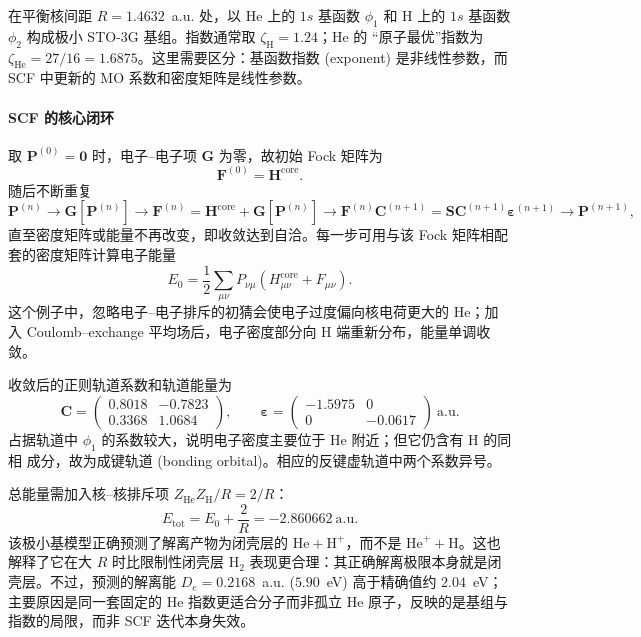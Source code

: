 \documentclass[fontset=none,12pt,a4paper]{ctexart}
\numberwithin{equation}{section}
\begin{document}
在平衡核间距 $R=1.4632$~a.u. 处，以 He 上的 $1s$ 基函数 $\phi_1$ 和 H 上的 $1s$
基函数 $\phi_2$ 构成极小 STO-3G 基组。指数通常取 $\zeta_{\mathrm H}=1.24$；He 的
``原子最优''指数为 $\zeta_{\mathrm{He}}=27/16=1.6875$。这里需要区分：基函数指数
(exponent) 是非线性参数，而 SCF 中更新的 MO 系数和密度矩阵是线性参数。

\paragraph{SCF 的核心闭环}
取 $\mathbf{P}^{(0)}=\mathbf{0}$ 时，电子--电子项 $\mathbf{G}$ 为零，故初始 Fock 矩阵为
\begin{equation}
  \mathbf{F}^{(0)}=\mathbf{H}^{\mathrm{core}}.
\end{equation}
随后不断重复
\begin{equation}
  \mathbf{P}^{(n)}
  \longrightarrow \mathbf{G}[\mathbf{P}^{(n)}]
  \longrightarrow \mathbf{F}^{(n)}=\mathbf{H}^{\mathrm{core}}+\mathbf{G}[\mathbf{P}^{(n)}]
  \longrightarrow \mathbf{F}^{(n)}\mathbf{C}^{(n+1)}
  =\mathbf{S}\mathbf{C}^{(n+1)}\boldsymbol{\varepsilon}^{(n+1)}
  \longrightarrow \mathbf{P}^{(n+1)},
\end{equation}
直至密度矩阵或能量不再改变，即收敛达到自洽。每一步可用与该 Fock
矩阵相配套的密度矩阵计算电子能量
\begin{equation}
  E_0=\frac{1}{2}\sum_{\mu\nu}P_{\nu\mu}
  \left(H^{\mathrm{core}}_{\mu\nu}+F_{\mu\nu}\right).
\end{equation}
这个例子中，忽略电子--电子排斥的初猜会使电子过度偏向核电荷更大的 He；加入
Coulomb--exchange 平均场后，电子密度部分向 H 端重新分布，能量单调收敛。

收敛后的正则轨道系数和轨道能量为
\begin{equation}
  \mathbf{C}=
  \begin{pmatrix}
    0.8018 & -0.7823 \\
    0.3368 &  1.0684
  \end{pmatrix},\qquad
  \boldsymbol{\varepsilon}=
  \begin{pmatrix}
    -1.5975 & 0 \\
    0 & -0.0617
  \end{pmatrix}\ \text{a.u.}
\end{equation}
占据轨道中 $\phi_1$ 的系数较大，说明电子密度主要位于 He 附近；但它仍含有 H 的同相
成分，故为成键轨道 (bonding orbital)。相应的反键虚轨道中两个系数异号。

总能量需加入核--核排斥项 $Z_{\mathrm{He}}Z_{\mathrm H}/R=2/R$：
\begin{equation}
  E_{\mathrm{tot}}=E_0+\frac{2}{R}=-2.860662~\text{a.u.}
\end{equation}
该极小基模型正确预测了解离产物为闭壳层的 $\mathrm{He}+\mathrm{H}^+$，而不是
$\mathrm{He}^{+}+\mathrm H$。这也解释了它在大 $R$ 时比限制性闭壳层 $\mathrm H_2$
表现更合理：其正确解离极限本身就是闭壳层。不过，预测的解离能
$D_e=0.2168$~a.u. ($5.90$~eV) 高于精确值约 $2.04$~eV；主要原因是同一套固定的 He
指数更适合分子而非孤立 He 原子，反映的是基组与指数的局限，而非 SCF 迭代本身失效。
\end{document}
